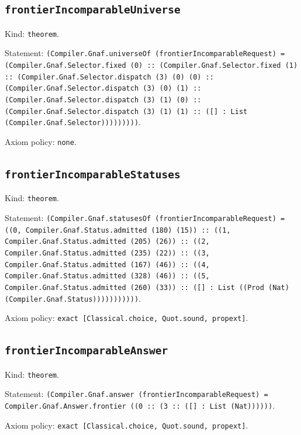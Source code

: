\documentclass[11pt]{article}
\begin{document}
\subsection*{\texttt{frontierIncomparableUniverse}}
\noindent Kind: \texttt{theorem}.\par
\noindent Statement: \texttt{(Compiler.Gnaf.universeOf (frontierIncomparableRequest) = (Compiler.Gnaf.Selector.fixed (0) :: (Compiler.Gnaf.Selector.fixed (1) :: (Compiler.Gnaf.Selector.dispatch (3) (0) (0) :: (Compiler.Gnaf.Selector.dispatch (3) (0) (1) :: (Compiler.Gnaf.Selector.dispatch (3) (1) (0) :: (Compiler.Gnaf.Selector.dispatch (3) (1) (1) :: ([] : List (Compiler.Gnaf.Selector)))))))))}.\par
\noindent Axiom policy: \texttt{none}.\par
\subsection*{\texttt{frontierIncomparableStatuses}}
\noindent Kind: \texttt{theorem}.\par
\noindent Statement: \texttt{(Compiler.Gnaf.statusesOf (frontierIncomparableRequest) = ((0, Compiler.Gnaf.Status.admitted (180) (15)) :: ((1, Compiler.Gnaf.Status.admitted (205) (26)) :: ((2, Compiler.Gnaf.Status.admitted (235) (22)) :: ((3, Compiler.Gnaf.Status.admitted (167) (46)) :: ((4, Compiler.Gnaf.Status.admitted (328) (46)) :: ((5, Compiler.Gnaf.Status.admitted (260) (33)) :: ([] : List ((Prod (Nat) (Compiler.Gnaf.Status)))))))))))}.\par
\noindent Axiom policy: \texttt{exact [Classical.choice, Quot.sound, propext]}.\par
\subsection*{\texttt{frontierIncomparableAnswer}}
\noindent Kind: \texttt{theorem}.\par
\noindent Statement: \texttt{(Compiler.Gnaf.answer (frontierIncomparableRequest) = Compiler.Gnaf.Answer.frontier ((0 :: (3 :: ([] : List (Nat))))))}.\par
\noindent Axiom policy: \texttt{exact [Classical.choice, Quot.sound, propext]}.\par
\end{document}
